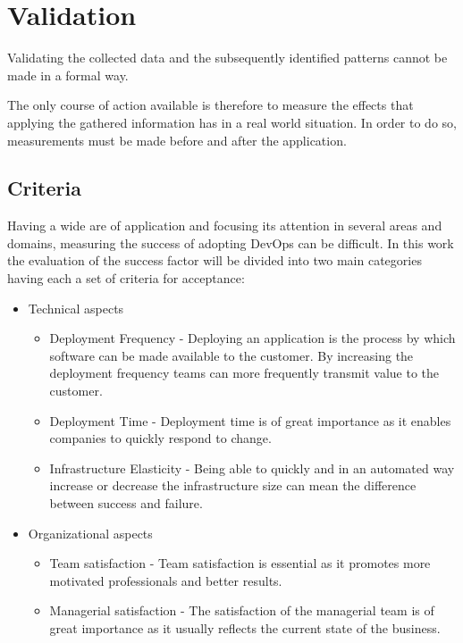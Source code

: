 \chapter{ Validation } \label{chap:validation}


Validating the collected data and the subsequently identified patterns cannot be made in a formal way.

The only course of action available is therefore to measure the effects that applying the gathered information has in a real world situation. In order to do so, measurements must be made before and after the application.

\section{Criteria}

Having a wide are of application and focusing its attention in several areas and domains, measuring the success of adopting DevOps can be difficult. In this work the evaluation of the success factor will be divided into two main categories having each a set of criteria for acceptance:


	\begin{itemize}
        \item{ Technical aspects }
        	\begin{itemize}
				\item{Deployment Frequency} - Deploying an application is the process by which software can be made available to the customer. By increasing the deployment frequency teams can more frequently transmit value to the customer. 
                
				\item{Deployment Time} - Deployment time is of great importance as it enables companies to quickly respond to change. 
                
				\item{Infrastructure Elasticity} - Being able to quickly and in an automated way increase or decrease the infrastructure size can mean the difference between success and failure. 
                
			\end{itemize}
            
            
        \item{ Organizational aspects }
        	\begin{itemize}
				\item{Team satisfaction} - Team satisfaction is essential as it promotes more motivated professionals and better results.
                
				\item{ Managerial satisfaction } - The satisfaction of the managerial team is of great importance as it usually reflects the current state of the business. 
                
			\end{itemize}

	\end{itemize}


